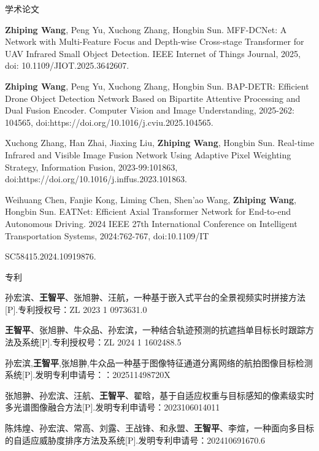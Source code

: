 
\begin{achievelist}
    \setlength\itemsep{2ex}
    \item[\uppercase\expandafter{\romannumeral1}.] 学术论文
    \setlength\itemsep{2ex}
    \item  \textbf{Zhiping Wang}, Peng Yu, Xuchong Zhang,  Hongbin Sun. MFF-DCNet: A Network with Multi-Feature Focus and Depth-wise Cross-stage Transformer for UAV Infrared Small Object Detection. IEEE Internet of Things Journal, 2025, doi: 10.1109/JIOT.2025.3642607. 
    \setlength\itemsep{1ex}
    \item \textbf{Zhiping Wang}, Peng Yu, Xuchong Zhang, Hongbin Sun. BAP-DETR: Efficient Drone Object Detection Network Based on Bipartite Attentive Processing and Dual Fusion Encoder. Computer Vision and Image Understanding, 2025-262: 104565, doi:https://doi.org/10.1016/j.cviu.2025.104565.
    
    \item Xuchong Zhang, Han Zhai, Jiaxing Liu, \textbf{Zhiping Wang}, Hongbin Sun. Real-time Infrared and Visible Image Fusion Network Using Adaptive Pixel Weighting Strategy, Information Fusion, 2023-99:101863, doi:https://doi.org/10.1016/j.inffus.2023.101863.

    \item Weihuang Chen, Fanjie Kong, Liming Chen, Shen'ao Wang, \textbf{Zhiping Wang}, Hongbin Sun. EATNet: Efficient Axial Transformer Network for End-to-end Autonomous Driving. 2024 IEEE 27th International Conference on Intelligent Transportation Systems, 2024:762-767, doi:10.1109/IT
    
    SC58415.2024.10919876.
    
    \setlength\itemsep{2ex}
    \item[\uppercase\expandafter{\romannumeral2}.]专利
    \setlength\itemsep{2ex}
    \item 孙宏滨、\textbf{王智平}、张旭翀、汪航，一种基于嵌入式平台的全景视频实时拼接方法[P].专利授权号：ZL 2023 1 0973631.0
    \item \textbf{王智平}、张旭翀、牛众品、孙宏滨，一种结合轨迹预测的抗遮挡单目标长时跟踪方法及系统[P].专利授权号：ZL 2024 1 1602488.5
    \item 孙宏滨,\textbf{王智平},张旭翀,牛众品一种基于图像特征通道分离网络的航拍图像目标检测系统[P].发明专利申请号：：202511498720X
    \item 张旭翀、孙宏滨、汪航、\textbf{王智平}、翟晗，基于自适应权重与目标感知的像素级实时多光谱图像融合方法[P].发明专利申请号：2023106014011
    \item 陈炜煌、孙宏滨、常高、刘露、王战锋、和永盟、\textbf{王智平}、李煊，一种面向多目标的自适应威胁度排序方法及系统[P].发明专利申请号：202410691670.6 
    \setlength\itemsep{2ex}
    
    

\end{achievelist}

\vspace{\baselineskip}
